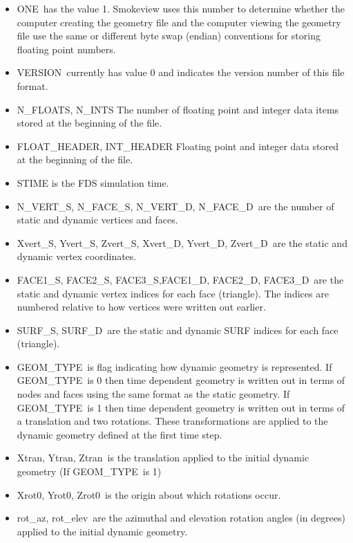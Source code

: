 \documentclass[11pt]{book}
\begin{document}
\begin{itemize}
\item {\ct ONE}\ has the value 1. Smokeview uses this number to determine whether the computer creating the geometry file and the computer viewing the geometry file use the same or different byte swap (endian) conventions for storing floating point numbers.
\item {\ct VERSION}\ currently has value 0 and indicates the version number of this file format.
\item {\ct N\_FLOATS, N\_INTS} The number of floating point and integer data items stored at the beginning of the file.
\item {\ct FLOAT\_HEADER, INT\_HEADER} Floating point and integer data stored at the beginning of the file.
\item {\ct STIME} is the FDS simulation time.
\item {\ct N\_VERT\_S, N\_FACE\_S, N\_VERT\_D, N\_FACE\_D}\ are the number of static and dynamic vertices and faces.
\item {\ct Xvert\_S, Yvert\_S, Zvert\_S, Xvert\_D, Yvert\_D, Zvert\_D}\ are the static and dynamic vertex coordinates.
\item {\ct FACE1\_S, FACE2\_S, FACE3\_S,FACE1\_D, FACE2\_D, FACE3\_D}\ are the static and dynamic vertex indices for each face (triangle).  The indices are numbered relative to how vertices were written out earlier.
\item {\ct SURF\_S, SURF\_D}\ are the static and dynamic SURF indices for each face (triangle).
\item {\ct GEOM\_TYPE}\ is flag indicating how dynamic geometry is represented. If {\ct GEOM\_TYPE}\ is 0 then time dependent geometry is written out in terms of nodes and faces using the same format as the static geometry. If {\ct GEOM\_TYPE}\ is 1 then time dependent geometry is written out in terms of a translation and two rotations.  These transformations are applied to the dynamic geometry defined at the first time step.
\item {\ct Xtran, Ytran, Ztran}\ is the translation applied to the initial dynamic geometry (If {\ct GEOM\_TYPE}\ is 1)
\item {\ct Xrot0, Yrot0, Zrot0}\ is the origin about which rotations occur.
\item {\ct rot\_az, rot\_elev}\ are the azimuthal and elevation rotation angles (in degrees) applied to the initial dynamic geometry.
\end{itemize}
\end{document}
